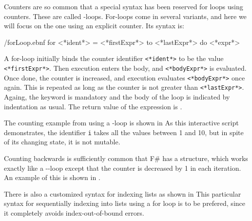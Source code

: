 \documentclass[fsharpNotes.tex]{subfiles}
\begin{document}
Counters are so common that a special syntax has been reserved for loops using counters. These are called -loops. For-loops come in several variants, and here we will focus on the one using an explicit counter. Its syntax is:
%
\begin{verbatimwrite}{\ebnf/forLoop.ebnf}
for <*ident*> = <*firstExpr*> to <*lastExpr*> do
  <*expr*>
\end{verbatimwrite}
%
A for-loop initially binds the counter identifier \lstinline[language=syntax]{<*ident*>} to be the value \lstinline[language=syntax]{<*firstExpr*>}. Then execution enters the body, and \lstinline[language=syntax]{<*bodyExpr*>} is evaluated. Once done, the counter is increased, and execution evaluates \lstinline[language=syntax]{<*bodyExpr*>}  once again. This is repeated as long as the counter is not greater than \lstinline[language=syntax]{<*lastExpr*>}. Againg, the  keyword is mandatory and the body of the loop is indicated by indentation as usual. The return value of the  expression is \lexeme{()}.

The counting example from  using a -loop is shown in 
%
%
As this interactive script demonstrates, the identifier \lstinline!i! takes all the values between 1 and 10, but in spite of its changing state, it is not mutable.

Counting backwards is sufficiently common that F\# has a  structure, which works exactly like a --loop except that the counter is decreased by 1 in each iteration. An example of this is shown in .
%
%

There is also a customized syntax for indexing lists as shown in 
%
%
This particular syntax for sequentially indexing into lists using a for loop is to be prefered, since it completely avoids index-out-of-bound errors.
\end{document}
